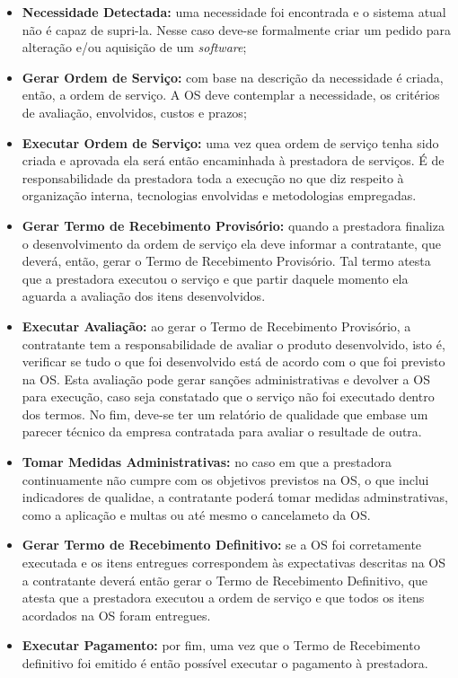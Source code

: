 \begin{itemize}
  \item \textbf{Necessidade Detectada:} uma necessidade foi encontrada e o
  sistema atual não é capaz de supri-la. Nesse caso deve-se formalmente criar
  um pedido para alteração e/ou aquisição de um \textit{software};
  \item \textbf{Gerar Ordem de Serviço:} com base na descrição da necessidade é
  criada, então, a ordem de serviço. A OS deve contemplar a necessidade, os
  critérios de avaliação, envolvidos, custos e prazos;
  \item \textbf{Executar Ordem de Serviço:} uma vez quea ordem de serviço tenha
  sido criada e aprovada ela será então encaminhada à prestadora de serviços. É
  de responsabilidade da prestadora toda a execução no que diz respeito à
  organização interna, tecnologias envolvidas e metodologias empregadas.
  \item \textbf{Gerar Termo de Recebimento Provisório:} quando a prestadora
  finaliza o desenvolvimento da ordem de serviço ela deve informar a contratante,
  que deverá, então, gerar o Termo de Recebimento Provisório. Tal termo atesta
  que a prestadora executou o serviço e que partir daquele momento ela aguarda
  a avaliação dos itens desenvolvidos.
  \item \textbf{Executar Avaliação:} ao gerar o Termo de Recebimento Provisório,
  a contratante tem a responsabilidade de avaliar o produto desenvolvido, isto é,
  verificar se tudo o que foi desenvolvido está de acordo com o que foi previsto
  na OS. Esta avaliação pode gerar sanções administrativas e devolver a OS para
  execução, caso seja constatado que o serviço não foi executado dentro dos termos.
  No fim, deve-se ter um relatório de qualidade que embase um parecer técnico da
  empresa contratada para avaliar o resultade de outra.
  \item \textbf{Tomar Medidas Administrativas:} no caso em que a prestadora
  continuamente não cumpre com os objetivos previstos na OS, o que inclui
  indicadores de qualidae, a contratante poderá tomar medidas adminstrativas,
  como a aplicação e multas ou até mesmo o cancelameto da OS.
  \item \textbf{Gerar Termo de Recebimento Definitivo:} se a OS foi corretamente
  executada e os itens entregues correspondem às expectativas descritas na
  OS a contratante deverá então gerar o Termo de Recebimento Definitivo, que
  atesta que a prestadora executou a ordem de serviço e que todos os itens
  acordados na OS foram entregues.
  \item \textbf{Executar Pagamento:} por fim, uma vez que o Termo de Recebimento
  definitivo foi emitido é então possível executar o pagamento à prestadora.
\end{itemize}

